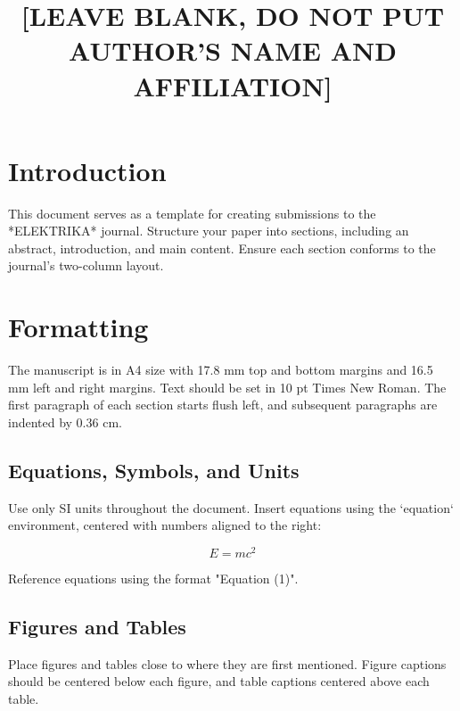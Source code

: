 \documentclass[10pt, twocolumn]{article}
\title{[LEAVE BLANK, DO NOT PUT AUTHOR’S NAME AND AFFILIATION]}
\date{}
\begin{document}

\section{Introduction}
This document serves as a template for creating submissions to the *ELEKTRIKA* journal. Structure your paper into sections, including an abstract, introduction, and main content. Ensure each section conforms to the journal’s two-column layout.

\section{Formatting}
The manuscript is in A4 size with 17.8 mm top and bottom margins and 16.5 mm left and right margins. Text should be set in 10 pt Times New Roman. The first paragraph of each section starts flush left, and subsequent paragraphs are indented by 0.36 cm.

\subsection{Equations, Symbols, and Units}
Use only SI units throughout the document. Insert equations using the `equation` environment, centered with numbers aligned to the right:

\begin{equation}
    E = mc^2
\end{equation}

Reference equations using the format "Equation (1)".

\subsection{Figures and Tables}
Place figures and tables close to where they are first mentioned. Figure captions should be centered below each figure, and table captions centered above each table.
\end{document}
